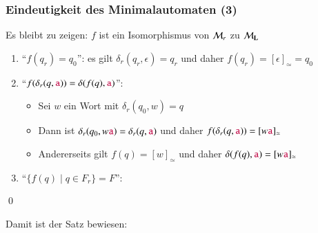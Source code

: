 \documentclass[onlymath]{beamer}
\begin{document}
\begin{frame}[t]\frametitle{Eindeutigkeit des Minimalautomaten (3)}

Es bleibt zu zeigen: $f$ ist ein Isomorphismus von $\mathcal{M}_r$ zu $\mathcal{M}_{\textbf{\textcolor{black}{L}}}$\pause

\begin{enumerate}[(1)]
\item "`$f(q_r)=q_0$"': \pause es gilt $\delta_r(q_r,\epsilon)=q_r$ und daher $f(q_r)=[\epsilon]_\simeq=q_0$ \pause
\item "`$f(\delta_r(q,\mathtt{\textcolor{purple}{a}})) = \delta(f(q),\mathtt{\textcolor{purple}{a}})$"': \pause
	\begin{itemize}
	\item Sei $w$ ein Wort mit $\delta_r(q_0,w)=q$\pause
	\item Dann ist $\delta_r(q_0,w\mathtt{\textcolor{purple}{a}})=\delta_r(q,\mathtt{\textcolor{purple}{a}})$ und daher $f(\delta_r(q,\mathtt{\textcolor{purple}{a}}))=[w\mathtt{\textcolor{purple}{a}}]_\simeq$\pause
	\item Andererseits gilt $f(q)=[w]_\simeq$ und daher $\delta(f(q),\mathtt{\textcolor{purple}{a}})=[w\mathtt{\textcolor{purple}{a}}]_\simeq$
	\end{itemize}\pause
\item "`$\{f(q)\mid q\in F_r\}=F$"': \pause
\end{enumerate}
\pause

\qed
\bigskip

Damit ist der Satz bewiesen:


\end{frame}
\end{document}
